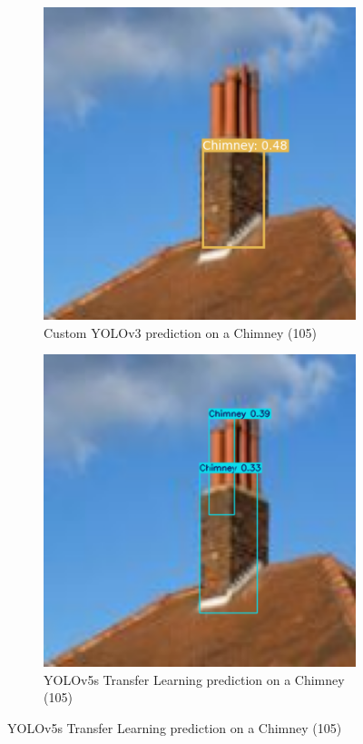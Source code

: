 \documentclass{article}
\begin{document}
\begin{figure}[htbp]
  \centering
  \begin{subfigure}{\textwidth}
    \centering
    \includegraphics[width=0.7\linewidth]{Chimney (105)_nms.png}
    \caption{Custom YOLOv3 prediction on a Chimney (105)}
    \label{fig:chimney_nms}
  \end{subfigure}
  \hfill
  \begin{subfigure}{\textwidth}
    \centering
    \includegraphics[width=0.7\linewidth]{Chimney (105)_tl.png}
    \caption{YOLOv5s Transfer Learning prediction on a Chimney (105)}
    \label{fig:chimney_tl}
  \end{subfigure}
  \label{fig:chimney_comparison}
\end{figure}
\end{document}
